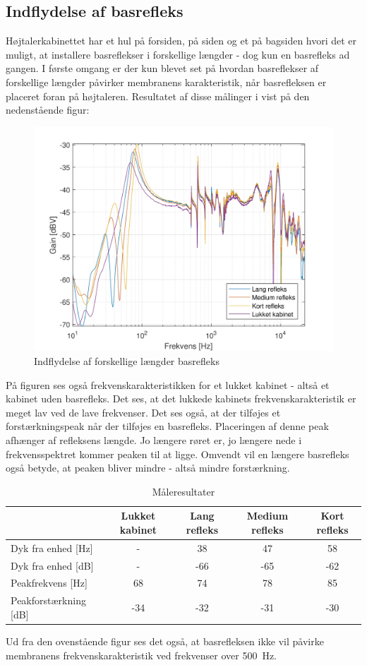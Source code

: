\subsection{Indflydelse af basrefleks}
Højtalerkabinettet har et hul på forsiden, på siden og et på bagsiden hvori det er muligt, at installere basreflekser i forskellige længder - dog kun en basrefleks ad gangen. I første omgang er der kun blevet set på hvordan basreflekser af forskellige længder påvirker membranens karakteristik, når basrefleksen er placeret foran på højtaleren. Resultatet af disse målinger i vist på den nedenstående figur:
\begin{figure}[H]
	\centering
	\vspace{-12pt}
	\includegraphics[width=\textwidth]{Pics/BassReflexMembrane}
	\caption{Indflydelse af forskellige længder basrefleks}
\end{figure}

På figuren ses også frekvenskarakteristikken for et lukket kabinet - altså et kabinet uden basrefleks. Det ses, at det lukkede kabinets frekvenskarakteristik er meget lav ved de lave frekvenser. Det ses også, at der tilføjes et forstærkningspeak når der tilføjes en basrefleks. Placeringen af denne peak afhænger af refleksens længde. Jo længere røret er, jo længere nede i frekvensspektret kommer peaken til at ligge. Omvendt vil en længere basrefleks også betyde, at peaken bliver mindre - altså mindre forstærkning.
\begin{table}[H]
	\centering
	\begin{tabular}{l|c|c|c|c}
		& Lukket kabinet & Lang refleks & Medium refleks & Kort refleks \\ \hline
		Dyk fra enhed {[}Hz{]}    & -              & 38              & 47                & 58             \\
		Dyk fra enhed {[}dB{]}    & -              & -66             & -65               & -62            \\
		Peakfrekvens {[}Hz{]}     & 68             & 74              & 78                & 85             \\
		Peakforstærkning {[}dB{]} & -34            & -32             & -31               & -30           
	\end{tabular}
	\caption{Måleresultater}
\end{table}

Ud fra den ovenstående figur ses det også, at basrefleksen ikke vil påvirke membranens frekvenskarakteristik ved frekvenser over \SI{500}{\hertz}.